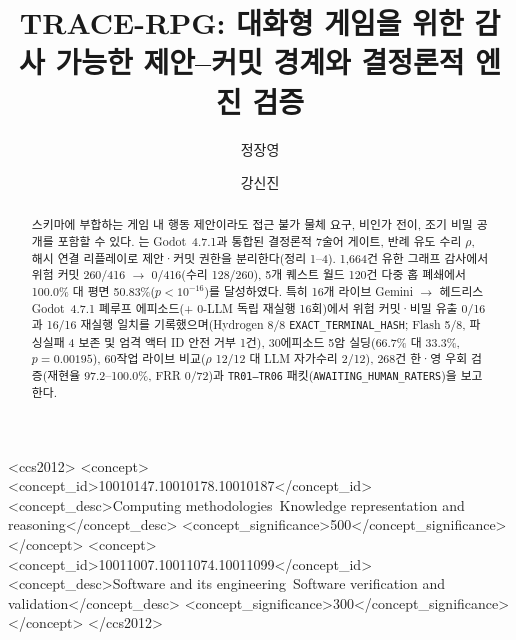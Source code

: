 \documentclass[sigconf,review]{acmart}
\begin{document}
\title{TRACE-RPG: 대화형 게임을 위한 감사 가능한 제안--커밋 경계와 결정론적 엔진 검증}

\author{정장영}
\author{강신진}

\begin{abstract}
스키마에 부합하는 게임 내 행동 제안이라도 접근 불가 물체 요구, 비인가 전이, 조기 비밀 공개를 포함할 수 있다. \system{}는 Godot~4.7.1과 통합된 결정론적 7술어 게이트, 반례 유도 수리 $\rho$, 해시 연결 리플레이로 제안·커밋 권한을 분리한다(정리 1--4). 1,664건 유한 그래프 감사에서 위험 커밋 260/416 $\rightarrow$ 0/416(수리 128/260), 5개 퀘스트 월드 120건 다중 홉 폐쇄에서 100.0\% 대 평면 50.83\%($p{<}10^{-16}$)를 달성하였다. 특히 16개 라이브 Gemini $\rightarrow$ 헤드리스 Godot~4.7.1 폐루프 에피소드(+ 0-LLM 독립 재실행 16회)에서 위험 커밋·비밀 유출 0/16과 16/16 재실행 일치를 기록했으며(Hydrogen 8/8 \texttt{EXACT\_}\allowbreak\texttt{TERMINAL\_}\allowbreak\texttt{HASH}; Flash 5/8, 파싱실패 4 보존 및 엄격 액터 ID 안전 거부 1건), 30에피소드 5암 실딩(66.7\% 대 33.3\%, $p{=}0.00195$), 60작업 라이브 비교($\rho$ 12/12 대 LLM 자가수리 2/12), 268건 한·영 우회 검증(재현율 97.2--100.0\%, FRR 0/72)과 \texttt{TR01--TR06} 패킷(\texttt{AWAITING\_}\allowbreak\texttt{HUMAN\_}\allowbreak\texttt{RATERS})을 보고한다.
\end{abstract}

\begin{CCSXML}
<ccs2012>
   <concept>
       <concept_id>10010147.10010178.10010187</concept_id>
       <concept_desc>Computing methodologies~Knowledge representation and reasoning</concept_desc>
       <concept_significance>500</concept_significance>
   </concept>
   <concept>
       <concept_id>10011007.10011074.10011099</concept_id>
       <concept_desc>Software and its engineering~Software verification and validation</concept_desc>
       <concept_significance>300</concept_significance>
   </concept>
</ccs2012>
\end{CCSXML}



\maketitle
\end{document}
